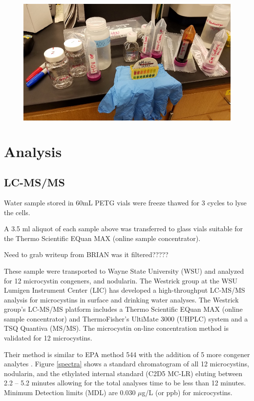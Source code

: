 \begin{figure}[!t]
\includegraphics[width=\textwidth]{figures/samplekit}
\label{samplekit}
\end{figure}


\clearpage
\newpage

\section{Analysis}



\subsection{LC-MS/MS}

Water sample stored in 60mL PETG vials were freeze thawed for 3 cycles to lyse the cells.



A 3.5 ml aliquot of each sample above was transferred to glass vials suitable for the Thermo Scientific EQuan MAX (online sample concentrator).

Need to grab writeup from BRIAN was it filtered?????

These sample were transported to Wayne State University (WSU) and analyzed for 12 microcystin congeners, and nodularin.  The Westrick group at the WSU Lumigen Instrument Center (LIC) has developed a high-throughput LC-MS/MS analysis for microcystins in surface and drinking water analyses. The Westrick group’s LC-MS/MS platform includes a Thermo Scientific EQuan MAX (online sample concentrator) and ThermoFisher’s UltiMate 3000 (UHPLC) system and a TSQ Quantiva (MS/MS). The microcystin on-line concentration method is validated for 12 microcystins.

Their method is similar to EPA method 544 with the addition of 5 more congener analytes \cite{shoemaker_method_2015}. Figure \ref{spectra} shows a standard chromatogram of all 12 microcystins, nodularin, and the ethylated internal standard (C2D5 MC-LR) eluting between 2.2 – 5.2 minutes allowing for the total analyses time to be less than 12 minutes.  Minimum Detection limits (MDL) are 0.030  $\mu$g/L (or ppb) for microcystins.

